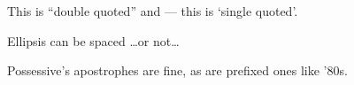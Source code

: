 This is ``double quoted'' and --- this is `single quoted'.

Ellipsis can be spaced \dots or not\dots

Possessive's apostrophes are fine, as are prefixed ones like '80s.


